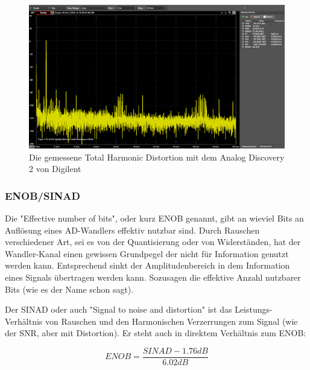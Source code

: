 \begin{figure} [H]
\begin{center}
 \includegraphics[width=\textwidth]{../graphics/THD_LineINOUT_Kopie.png}
 \caption{Die gemessene Total Harmonic Distortion mit dem Analog Discovery 2 von Digilent}
\label{fig:thdAD2}
\end{center}
\end{figure}

\subsubsection{ENOB/SINAD}
\label{subsubsec:ENOB/SINAD}

Die "Effective number of bits", oder kurz ENOB genannt, gibt an wieviel Bits an Auflösung eines AD-Wandlers effektiv nutzbar sind. Durch Rauschen verschiedener Art, sei es von der Quantisierung oder von Widerständen, hat der Wandler-Kanal einen gewissen Grundpegel der nicht für Information genutzt werden kann. Entsprechend sinkt der Amplitudenbereich in dem Information eines Signals übertragen werden kann. Sozusagen die effektive Anzahl nutzbarer Bits (wie es der Name schon sagt).

Der SINAD oder auch "Signal to noise and distortion" ist das Leistungs-Verhältnis  von Rauschen und den Harmonischen Verzerrungen zum Signal (wie der SNR, aber mit Distortion). Er steht auch in direktem Verhältnis zum ENOB:

\begin{equation}
ENOB=\frac{SINAD-1.76dB}{6.02dB}
\end{equation} 